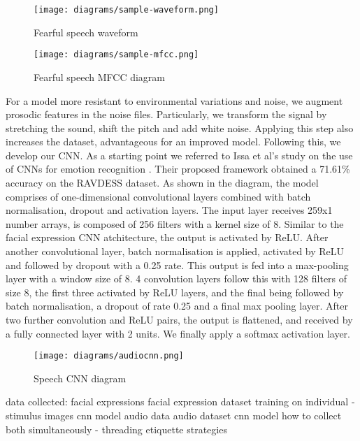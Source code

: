 \documentclass[12pt,a4paper]{article}
\begin{document}
\begin{figure}[h]
	\centerline{\texttt{[image: diagrams/sample-waveform.png]}}
	\caption{Fearful speech waveform}
\end{figure}

\begin{figure}[h]
	\centerline{\texttt{[image: diagrams/sample-mfcc.png]}}
	\caption{Fearful speech MFCC diagram}
\end{figure}

For a model more resistant to environmental variations and noise, we augment prosodic features in the noise files. Particularly, we transform the signal by stretching the sound, shift the pitch and add white noise. Applying this step also increases the dataset, advantageous for an improved model. Following this, we develop our CNN. As a starting point we referred to Issa et al's study on the use of CNNs for emotion recognition \cite{ISSA2020101894}. Their proposed framework obtained a 71.61\% accuracy on the RAVDESS dataset. As shown in the diagram, the model comprises of one-dimensional convolutional layers combined with batch normalisation, dropout and activation layers. The input layer receives 259x1 number arrays, is composed of 256 filters with a kernel size of 8. Similar to the facial expression CNN atchitecture, the output is activated by ReLU. After another convolutional layer, batch normalisation is applied, activated by ReLU and followed by dropout with a 0.25 rate. This output is fed into a max-pooling layer with a window size of 8. 4 convolution layers follow this with 128 filters of size 8, the first three activated by ReLU layers, and the final being followed by batch normalisation, a dropout of rate 0.25 and a final max pooling layer. After two further convolution and ReLU pairs, the output is flattened, and received by a fully connected layer with 2 units. We finally apply a softmax activation layer.





\begin{figure}[h]
	\centerline{\texttt{[image: diagrams/audiocnn.png]}}
	\caption{Speech CNN diagram}
\end{figure}

data collected:
facial expressions
facial expression dataset
training on individual - stimulus images 
cnn model
audio data
audio dataset
cnn model
how to collect both simultaneously - threading
etiquette strategies
\end{document}
